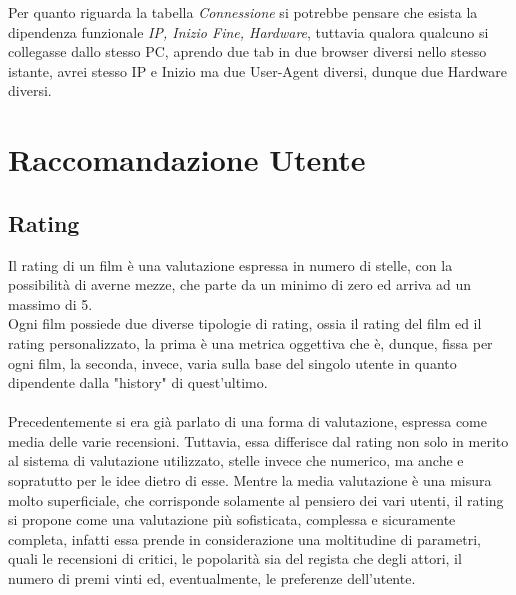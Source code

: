 \documentclass{article}
\begin{document}
Per quanto riguarda la tabella \textit{Connessione} si potrebbe pensare che esista la dipendenza funzionale {\small \textit{IP, Inizio \textrightarrow Fine, Hardware}}, tuttavia qualora qualcuno si collegasse dallo stesso PC, aprendo due tab in due browser diversi nello stesso istante, avrei stesso IP e Inizio ma due User-Agent diversi, dunque due Hardware diversi. \\ 
\section{Raccomandazione Utente}
\subsection{Rating}
Il rating di un film è una valutazione espressa in numero di stelle, con la possibilità di averne mezze, che parte da un minimo di zero ed arriva ad un massimo di 5. \\
Ogni film possiede due diverse tipologie di rating, ossia il rating del film ed il rating personalizzato, la prima è una metrica oggettiva che è, dunque, fissa per ogni film, la seconda, invece, varia sulla base del singolo utente in quanto dipendente dalla "history" di quest'ultimo. \\ \\
Precedentemente si era già parlato di una forma di valutazione, espressa come media delle varie recensioni. Tuttavia, essa differisce dal rating non solo in merito al sistema di valutazione utilizzato, stelle invece che numerico, ma anche e sopratutto per le idee dietro di esse. Mentre la media valutazione è una misura molto superficiale, che corrisponde solamente al pensiero dei vari utenti, il rating si propone come una valutazione più sofisticata, complessa e sicuramente completa, infatti essa prende in considerazione una moltitudine di parametri, quali le recensioni di critici, le popolarità sia del regista che degli attori, il numero di premi vinti ed, eventualmente, le preferenze dell'utente.
\end{document}
